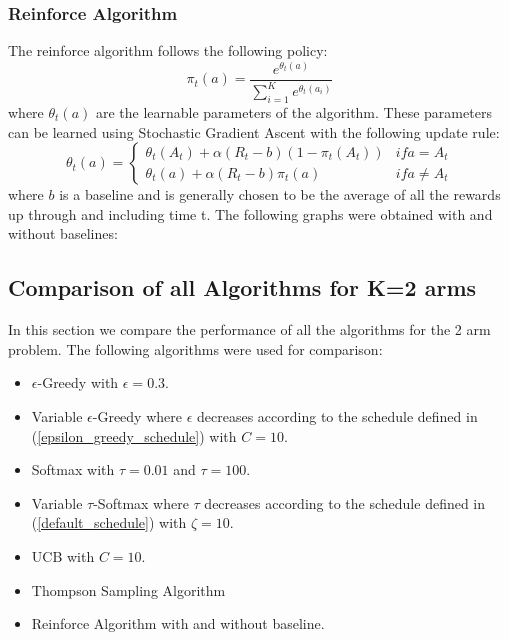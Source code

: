 \documentclass{article}
\begin{document}
		\subsubsection{Reinforce Algorithm}
		The reinforce algorithm follows the following policy:
		\begin{equation}
		\nonumber
			\pi_{t}(a) = \frac{e^{\theta_{t}(a)}}{\sum_{i=1}^{K} e^{\theta_{t}(a_{i})}}
		\end{equation}
		where $\theta_{t}(a)$ are the learnable parameters of the algorithm. These parameters can be learned using Stochastic Gradient Ascent with the following
		update rule:
		\begin{equation}
		\nonumber
			\theta_{t}(a) = \begin{cases}
				\theta_{t}(A_{t}) + \alpha (R_{t} - b) (1 - \pi_{t}(A_{t})) & if a = A_{t} \\
				\theta_{t}(a) + \alpha (R_{t} - b) \pi_{t}(a) & if a \ne A_{t}
			\end{cases}
		\end{equation}
		where $b$ is a baseline and is generally chosen to be the average of all the rewards up through and including time t. The following graphs were obtained
		with and without baselines:
		
		\subsection{Comparison of all Algorithms for K=2 arms}
		\label{2_bernoulli_comparison}
		In this section we compare the performance of all the algorithms for the 2 arm problem. The following algorithms were used for comparison:
		\begin{itemize}
			\item $\epsilon$-Greedy with $\epsilon=0.3$.
			\item Variable $\epsilon$-Greedy where $\epsilon$ decreases according to the schedule defined in (\ref{epsilon_greedy_schedule}) with $C=10$.
			\item Softmax with $\tau=0.01$ and $\tau=100$. 
			\item Variable $\tau$-Softmax where $\tau$ decreases according to the schedule defined in (\ref{default_schedule}) with $\zeta=10$.
			\item UCB with $C=10$.
			\item Thompson Sampling Algorithm
			\item Reinforce Algorithm with and without baseline.
		\end{itemize}
		
\end{document}
